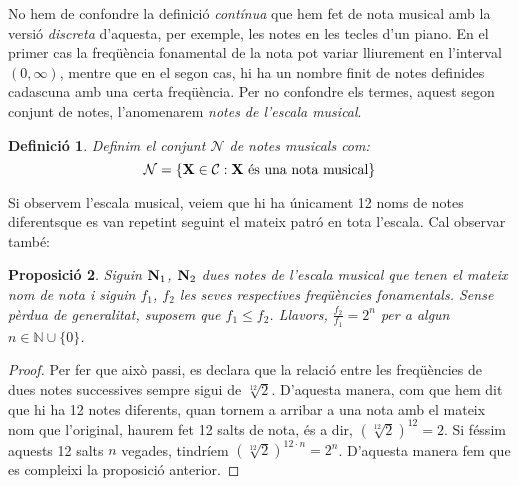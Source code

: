 \documentclass{article}
\theoremstyle{math}
\newtheorem{definition}{Definició}[section]
\newtheorem{prop}[definition]{Proposició}
\theoremstyle{TheoremNum}
\newcommand{\0}{\ensuremath{\vb{0}}}
\newcommand{\N}{\ensuremath{\vb{N}}}
\newcommand{\X}{\ensuremath{\vb{X}}}
\begin{document}
\noindent No hem de confondre la definició \textit{contínua} que hem fet de nota musical amb la versió \textit{discreta} d'aquesta, per exemple, les notes en les tecles d'un piano. En el primer cas la freqüència fonamental de la nota pot variar lliurement en l'interval $(0,\infty)$, mentre que en el segon cas, hi ha un nombre finit de notes definides cadascuna amb una certa freqüència. Per no confondre els termes, aquest segon conjunt de notes, l'anomenarem \textit{notes de l'escala musical}.
\begin{definition}
  Definim el conjunt $\mathcal{N}$ de notes musicals com: $$\mathcal{N}=\left\{\X\in\mathcal{C}:\X\text{ és una nota musical}\right\}$$
\end{definition}
\noindent Si observem l'escala musical, veiem que hi ha únicament 12 noms de notes diferents\footnotemark\space que es van repetint seguint el mateix patró en tota l'escala. Cal observar també:
\begin{prop}
  Siguin $\N_1$, $\N_2$ dues notes de l'escala musical que tenen el mateix nom de nota i siguin $f_1$, $f_2$ les seves respectives freqüències fonamentals. Sense pèrdua de generalitat, suposem que $f_1 \leq f_2$. Llavors, $\frac{f_{2}}{f_{1}} = 2^n$ per a algun $n \in \mathbb{N}\cup\{0\}$.
\end{prop}
\begin{proof}
  Per fer que això passi, es declara que la relació entre les freqüències de dues notes successives sempre sigui de $\sqrt[12]{2}$\footnotemark. D'aquesta manera, com que hem dit que hi ha 12 notes diferents, quan tornem a arribar a una nota amb el mateix nom que l'original, haurem fet 12 salts de nota, és a dir, $\left(\sqrt[12]{2}\right)^{12} = 2$. Si féssim aquests 12 salts $n$ vegades, tindríem ${\left(\sqrt[12]{2}\right)}^{12\cdot n} = 2^n$. D'aquesta manera fem que es compleixi la proposició anterior. 
\end{proof}
\end{document}

